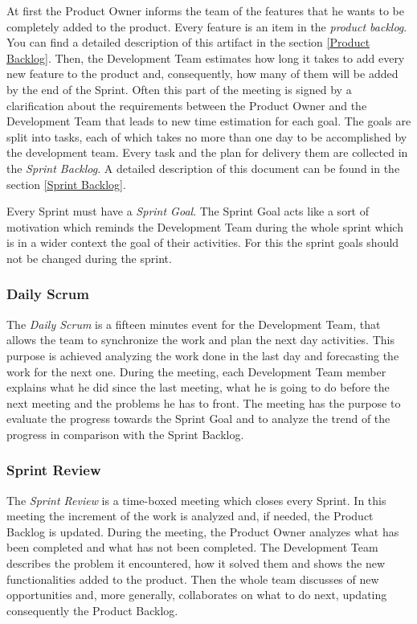 			At first the Product Owner informs the team of the features that he wants to be completely added to the product. Every feature is an item in the \emph{product backlog}. You can find a detailed description of this artifact in the section \ref{Product Backlog}. Then, the Development Team estimates how long it takes to add every new feature to the product and, consequently, how many of them will be added by the end of the Sprint. Often this part of the meeting is signed by a clarification about the requirements between the Product Owner and the Development Team that leads to new time estimation for each goal. The goals are split into tasks, each of which takes no more than one day to be accomplished by the development team. Every task and the plan for delivery them are collected in the \emph{Sprint Backlog}. A detailed description of this document can be found in the section \ref{Sprint Backlog}.

			Every Sprint must have a \emph{Sprint Goal}. The Sprint Goal acts like a sort of motivation which reminds the Development Team during the whole sprint which is in a wider context the goal of their activities. For this the sprint goals should not be changed during the sprint.
		
			\subsubsection{Daily Scrum}
			The \emph{Daily Scrum} is a fifteen minutes event for the Development Team, that allows the team to synchronize the work and plan the next day activities. This purpose is achieved analyzing the work done in the last day and forecasting the work for the next one. 
			During the meeting, each Development Team member explains what he did since the last meeting, what he is going to do before the next meeting and the problems he has to front.
			The meeting has the purpose to evaluate the progress towards the Sprint Goal and to analyze the trend of the progress in comparison with the Sprint Backlog. 

			\subsubsection{Sprint Review}
			The \emph{Sprint Review} is a time-boxed meeting which closes every Sprint. In this meeting the increment of the work is analyzed and, if needed, the Product Backlog is updated. 
			During the meeting, the Product Owner analyzes what has been completed and what has not been completed. The Development Team describes the problem it encountered, how it solved them and shows the new functionalities added to the product. Then the whole team discusses of new opportunities and, more generally, collaborates on what to do next, updating consequently the Product Backlog.			


